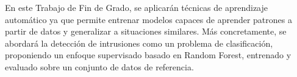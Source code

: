 En este Trabajo de Fin de Grado, se aplicarán técnicas de aprendizaje automático ya que permite entrenar modelos capaces de aprender patrones a partir de datos y generalizar a situaciones similares. Más concretamente, se abordará la detección de intrusiones como un problema de clasificación, proponiendo un enfoque supervisado basado en Random Forest, entrenado y evaluado sobre un conjunto de datos de referencia.
